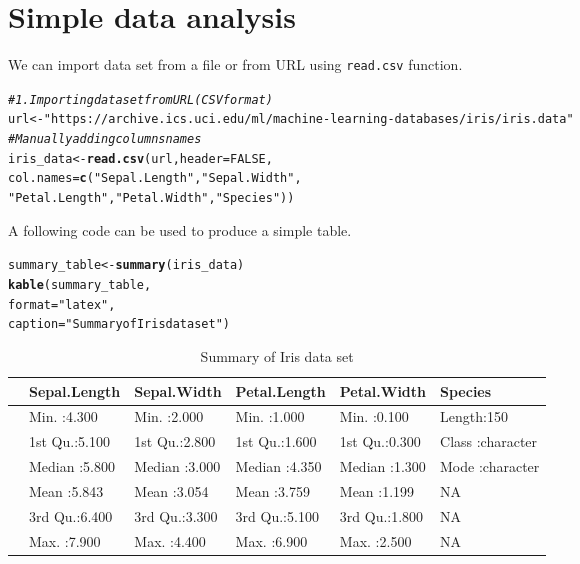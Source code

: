 \documentclass[12pt, a4paper]{article}\usepackage[]{graphicx}\usepackage[]{xcolor}
\makeatletter
\newcommand{\hlnum}[1]{\textcolor[rgb]{0.686,0.059,0.569}{#1}}%
\newcommand{\hlsng}[1]{\textcolor[rgb]{0.192,0.494,0.8}{#1}}%
\newcommand{\hlcom}[1]{\textcolor[rgb]{0.678,0.584,0.686}{\textit{#1}}}%
\newcommand{\hldef}[1]{\textcolor[rgb]{0.345,0.345,0.345}{#1}}%
\newcommand{\hlkwb}[1]{\textcolor[rgb]{0.69,0.353,0.396}{#1}}%
\newcommand{\hlkwc}[1]{\textcolor[rgb]{0.333,0.667,0.333}{#1}}%
\newcommand{\hlkwd}[1]{\textcolor[rgb]{0.737,0.353,0.396}{\textbf{#1}}}%
\newenvironment{kframe}{%
 \def\at@end@of@kframe{}%
 \ifinner\ifhmode%
  \def\at@end@of@kframe{\end{minipage}}%
  \begin{minipage}{\columnwidth}%
 \fi\fi%
 \def\FrameCommand##1{\hskip\@totalleftmargin \hskip-\fboxsep
 \colorbox{shadecolor}{##1}\hskip-\fboxsep
     \hskip-\linewidth \hskip-\@totalleftmargin \hskip\columnwidth}%
 \MakeFramed {\advance\hsize-\width
   \@totalleftmargin\z@ \linewidth\hsize
   \@setminipage}}%
 {\par\unskip\endMakeFramed%
 \at@end@of@kframe}
\newenvironment{knitrout}{}{} %
\makeatother
\begin{document}
\section{Simple data analysis}
\label{s:dataanalysis}
We can import data set from a file or from URL using \texttt{read.csv} function.
\begin{knitrout}
\color{fgcolor}\begin{kframe}
\begin{alltt}
\hlcom{# 1. Importing data set from URL (CSV format)}
\hldef{url} \hlkwb{<-} \hlsng{"https://archive.ics.uci.edu/ml/machine-learning-databases/iris/iris.data"}
\hlcom{# Manually adding columns names}
\hldef{iris_data} \hlkwb{<-} \hlkwd{read.csv}\hldef{(url,} \hlkwc{header} \hldef{=} \hlnum{FALSE}\hldef{,}
                      \hlkwc{col.names} \hldef{=} \hlkwd{c}\hldef{(}\hlsng{"Sepal.Length"}\hldef{,} \hlsng{"Sepal.Width"}\hldef{,}
                                    \hlsng{"Petal.Length"}\hldef{,} \hlsng{"Petal.Width"}\hldef{,} \hlsng{"Species"}\hldef{))}
\end{alltt}
\end{kframe}
\end{knitrout}

A following code can be used to produce a simple table.
\begin{kframe}
\begin{alltt}
\hldef{summary_table} \hlkwb{<-} \hlkwd{summary}\hldef{(iris_data)}
\hlkwd{kable}\hldef{(summary_table,}
      \hlkwc{format} \hldef{=} \hlsng{"latex"}\hldef{,}
      \hlkwc{caption} \hldef{=} \hlsng{"Summary of Iris data set"}\hldef{)}
\end{alltt}
\end{kframe}\begin{table}

\caption{\label{tab:SummaryTable}Summary of Iris data set}
\centering
\begin{tabular}[t]{l|l|l|l|l|l}
\hline
  &  Sepal.Length &  Sepal.Width &  Petal.Length &  Petal.Width &   Species\\
\hline
 & Min.   :4.300 & Min.   :2.000 & Min.   :1.000 & Min.   :0.100 & Length:150\\
\hline
 & 1st Qu.:5.100 & 1st Qu.:2.800 & 1st Qu.:1.600 & 1st Qu.:0.300 & Class :character\\
\hline
 & Median :5.800 & Median :3.000 & Median :4.350 & Median :1.300 & Mode  :character\\
\hline
 & Mean   :5.843 & Mean   :3.054 & Mean   :3.759 & Mean   :1.199 & NA\\
\hline
 & 3rd Qu.:6.400 & 3rd Qu.:3.300 & 3rd Qu.:5.100 & 3rd Qu.:1.800 & NA\\
\hline
 & Max.   :7.900 & Max.   :4.400 & Max.   :6.900 & Max.   :2.500 & NA\\
\hline
\end{tabular}
\end{table}
\end{document}
